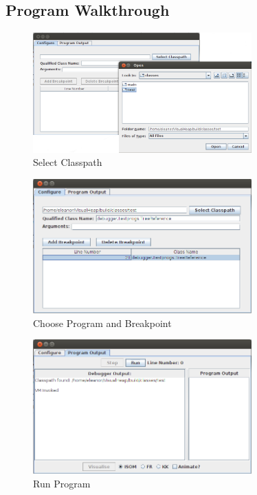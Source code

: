 \documentclass[11pt, a4paper]{report}
\begin{document}
\begin{appendices}
\chapter{Program Walkthrough}

\begin{figure}[h]
        \centering
        \includegraphics[width=0.75\textwidth]{images/final/walk1.png}
        \caption{Select Classpath}
\end{figure}

\begin{figure}[h]
        \centering
        \includegraphics[width=0.75\textwidth]{images/final/walk2.png}
        \caption{Choose Program and Breakpoint}
\end{figure}

\begin{figure}[h]
        \centering
        \includegraphics[width=0.75\textwidth]{images/final/walk3.png}
        \caption{Run Program}
\end{figure}


\end{appendices}
\end{document}
